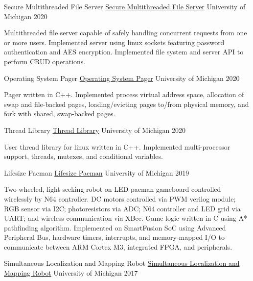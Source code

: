 \documentclass[11pt, a4paper]{cv}
\begin{document}
\begin{cv}
\begin{projects}
\begin{cventries}
\cventrycompact
{\ifstrempty{}
{Secure Multithreaded File Server}
{\color{hrefblue}\href{}{Secure Multithreaded File Server}}}
{}
{University of Michigan}
{2020}
{\begin{cvparagraph}
Multithreaded file server capable of safely handling concurrent requests from one or more users. Implemented server using linux sockets featuring password authentication and AES encryption. Implemented file system and server API to perform CRUD operations.
\end{cvparagraph}}
\cventrycompact
{\ifstrempty{}
{Operating System Pager}
{\color{hrefblue}\href{}{Operating System Pager}}}
{}
{University of Michigan}
{2020}
{\begin{cvparagraph}
Pager written in C++. Implemented process virtual address space, allocation of swap and file-backed pages, loading/evicting pages to/from physical memory, and fork with shared, swap-backed pages.
\end{cvparagraph}}
\cventrycompact
{\ifstrempty{}
{Thread Library}
{\color{hrefblue}\href{}{Thread Library}}}
{}
{University of Michigan}
{2020}
{\begin{cvparagraph}
User thread library for linux written in C++. Implemented multi-processor support, threads, mutexes, and conditional variables.
\end{cvparagraph}}
\cventrycompact
{
{Lifesize Pacman}
{\color{hrefblue}\href{https://drive.google.com/drive/folders/17rF1uKOLnCBRHLGBaE6ZqqsGw5RSQBDj}{Lifesize Pacman}}}
{}
{University of Michigan}
{2019}
{\begin{cvparagraph}
Two-wheeled, light-seeking robot on LED pacman gameboard controlled wirelessly by N64 controller. DC motors controlled via PWM verilog module; RGB sensor via I2C; photoresistors via ADC; N64 controller and LED grid via UART; and wireless communication via XBee. Game logic written in C using A* pathfinding algorithm. Implemented on SmartFusion SoC using Advanced Peripheral Bus, hardware timers, interrupts, and memory-mapped I/O to communicate between ARM Cortex M3, integrated FPGA, and peripherals.
\end{cvparagraph}}
\cventrycompact
{
{Simultaneous Localization and Mapping Robot}
{\color{hrefblue}\href{https://drive.google.com/drive/folders/17grbDyJVI5lJKkwWEvUcQP1EiyA9-lvp}{Simultaneous Localization and Mapping Robot}}}
{}
{University of Michigan}
{2017}
{\begin{cvparagraph}

\end{cvparagraph}}
\end{cventries}
\end{projects}
\end{cv}
\end{document}
